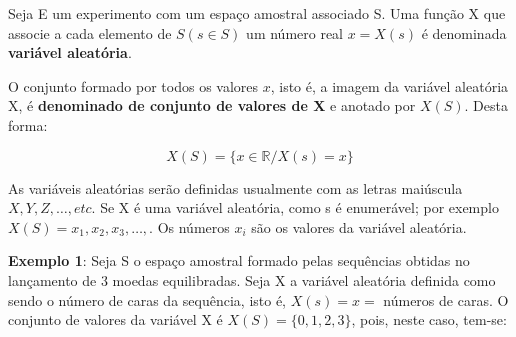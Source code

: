 \documentclass[a4paper,12pt]{report}
\begin{document}
{Seja E um experimento com um espaço amostral associado S. Uma
função X que associe a cada elemento de $S(s \in S)$ um número
real $x=X(s)$ é denominada \textbf{variável aleatória}.\vskip0.3cm

\par O conjunto formado por todos os valores $x$, isto é, a imagem
da variável aleatória X, é \textbf{denominado de conjunto de
valores de X} e anotado por $X(S)$. Desta forma:

$$
X(S) = \{ x \in \mathbb{R}/X(s)=x  \}
$$


As variáveis aleatórias serão definidas usualmente com as letras
maiúscula $X, Y, Z, \ldots, etc$. Se X é uma variável aleatória,
como s é enumerável; por exemplo
$X(S)={x_{1},x_{2},x_{3},\ldots,}$. Os números $x_{i}$ são os
valores da variável aleatória.\vskip0.3cm

\textbf{Exemplo 1}: Seja S o espaço amostral formado pelas
sequências obtidas no lançamento de 3 moedas equilibradas. Seja X
a variável aleatória definida como sendo o número de caras da
sequência, isto é, $X(s)=x=$ números de caras. O conjunto de
valores da variável X é $X(S)=\{0,1,2,3\}$, pois, neste caso,
tem-se:

\begin{table}[!htb]
\end{table}




}
\end{document}
